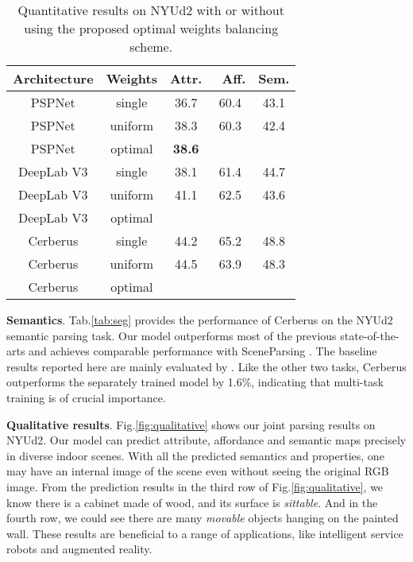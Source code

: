 \documentclass[10pt,twocolumn,letterpaper]{article}
\begin{document}
\begin{table}
	\centering
	\small 
	\begin{tabular}{c|c|ccc}
		\toprule
\textbf{Architecture} & \textbf{Weights} & \textbf{Attr.} & \ \textbf{Aff.} & \textbf{Sem.} \\
		\midrule
	    PSPNet  & single & 36.7 & 60.4 &  43.1\\
	    PSPNet & uniform & 38.3 & 60.3 & 42.4 \\
		PSPNet & optimal &\textbf{38.6} & {}  &  \\
		\midrule
		DeepLab V3  &single&  38.1 & 61.4 & 44.7 \\
		DeepLab V3 & uniform &  41.1 & 62.5 & 43.6\\
		DeepLab V3 & optimal & & &   \\	
		\midrule
		Cerberus &single & {44.2} & 65.2 & 48.8\\
		Cerberus & uniform &  {44.5} & 63.9 & 48.3\\
		Cerberus & optimal & {}  & {} & {} \\
		\bottomrule
	\end{tabular}
	\caption{Quantitative results on NYUd2 with or without using the proposed optimal weights balancing scheme.}
	\label{tab:moo}
\end{table}
\textbf{Semantics}. Tab.\ref{tab:seg} provides the performance of Cerberus on the NYUd2 semantic parsing task. Our model outperforms most of the previous state-of-the-arts and achieves comparable performance with SceneParsing \cite{shi2019scene}. The baseline results reported here are mainly evaluated by \cite{chen2020bi}.  Like the other two tasks, Cerberus outperforms the separately trained model by 1.6\%, indicating that multi-task training is of crucial importance.

\textbf{Qualitative results}. Fig.\ref{fig:qualitative} shows our joint parsing results on NYUd2. Our model can predict attribute, affordance and semantic maps precisely in diverse indoor scenes. With all the predicted semantics and properties, one may have an internal image of the scene even without seeing the original RGB image. From the prediction results in the third row of Fig.\ref{fig:qualitative}, we know there is a cabinet made of wood, and its surface is \emph{sittable}. And in the fourth row, we could see there are many \emph{movable} objects hanging on the painted wall. These results are beneficial to a range of applications, like intelligent service robots and augmented reality.
\end{document}

